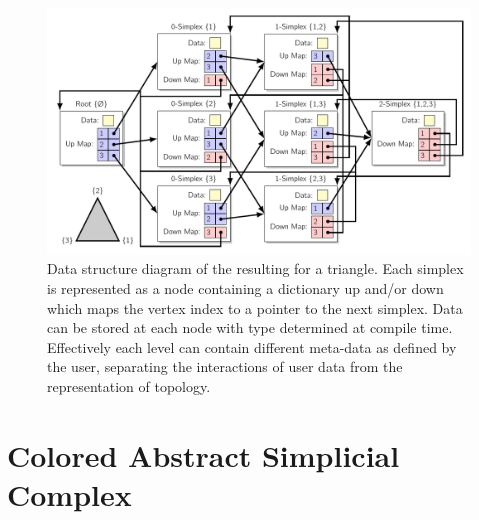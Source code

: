 \begin{figure}[ht!]
	\centering
	\includegraphics[width=\textwidth]{Figures/datastructure/ds}
	\caption[\asc data structure diagram]{Data structure diagram of the resulting \asc for a triangle. Each simplex is represented as a node containing a dictionary up and/or down which maps the vertex index to a pointer to the next simplex. Data can be stored at each node with type determined at compile time. Effectively each level can contain different meta-data as defined by the user, separating the interactions of user data from the representation of topology.}
	\label{fig:datastruct}
\end{figure}

\section{Colored Abstract Simplicial Complex}\label{sec:casc}

